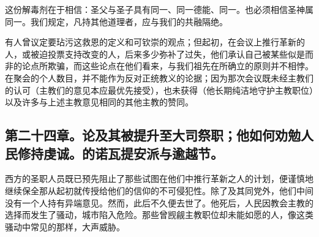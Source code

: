 \par

这份解毒剂在于相信：圣父与圣子具有同一、同一德能、同一。也必须相信圣神属同一。我们规定，凡持其他道理者，应与我们的共融隔绝。\par

有人曾议定要玷污这救恩的定义和可钦崇的观点；但起初，在会议上推行革新的人，或被迫投票支持改变的人，后来多少弥补了过失，他们承认自己被某些似是而非的论点所欺骗，而这些论点在他们看来，与我们祖先在所确立的原则并不相悖。在聚会的个人数目，并不能作为反对正统教义的论据；因为那次会议既未经主教们的认可（主教们的意见本应最优先接受），也未获得（他长期纯洁地守护主教职位）以及许多与上述主教意见相同的其他主教的赞同。\par

\par


\subsection{第二十四章。论及其被提升至大司祭职；他如何劝勉人民修持虔诚。的诺瓦提安派与逾越节。}

西方的圣职人员既已预先阻止了那些试图在他们中推行革新之人的计划，便谨慎地继续保全那从起初就传授给他们的信仰的不可侵犯性。除了及其同党外，他们中间没有一个人持有异端意见。然而，此后不久便去世了。他死后，人民因教会主教的选择而发生了骚动，城市陷入危险。那些曾觊觎主教职位却未能如愿的人，像这类骚动中常见的那样，大声威胁。\par

